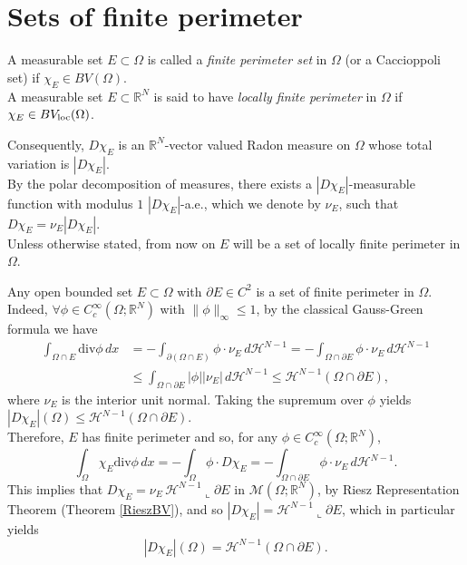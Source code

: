 \section{Sets of finite perimeter}

\begin{definition} A measurable set $E \subset \Omega$ is called a {\em finite perimeter set} in $\Omega$ (or a Caccioppoli set) if $\chi_{E} \in BV(\Omega)$.
\\
A measurable set $E \subset \mathbb{R}^{N}$ is said to have {\em locally finite perimeter} in $\Omega$ if $\chi_{E} \in BV_{\rm loc}(\Omega)$.
\end{definition}

Consequently, $D\chi_{E}$ is an $\mathbb{R}^{N}$-vector valued Radon measure on $\Omega$ whose total variation is $|D\chi_{E}|$.
\\
By the polar decomposition of measures, there exists a $|D\chi_{E}|$-measurable function with modulus $1$ $|D\chi_{E}|$-a.e., which we denote by $\nu_{E}$, such that $D\chi_{E} = \nu_{E} |D\chi_{E}|$.
\\
Unless otherwise stated, from now on $E$ will be a set of locally finite perimeter in $\Omega$.

\begin{example} Any open bounded set $E \subset \Omega$ with $\partial E \in C^{2}$ is a set of finite perimeter in $\Omega$.
\\ 
Indeed, $\forall \phi \in C_{c}^{\infty}(\Omega; \mathbb{R}^{N})$ with $\|\phi\|_{\infty} \le 1$, by the classical Gauss-Green formula we have
\begin{align*} \int_{\Omega \cap E} \mathrm{div} \phi \, dx & = - \int_{\partial(\Omega \cap E)} \phi \cdot \nu_{E} \, d\mathcal{H}^{N - 1}  = - \int_{\Omega \cap \partial E} \phi \cdot \nu_{E} \, d\mathcal{H}^{N - 1} \\
& \le \int_{\Omega \cap \partial E} |\phi| |\nu_{E}| \, d\mathcal{H}^{N - 1} \le \mathcal{H}^{N - 1}(\Omega \cap \partial E), 
\end{align*}
where $\nu_{E}$ is the interior unit normal. Taking the supremum over $\phi$ yields $|D \chi_{E}|(\Omega) \le \mathcal{H}^{N - 1}(\Omega \cap \partial E)$.
\\
Therefore, $E$ has finite perimeter and so, for any $\phi \in C^{\infty}_{c}(\Omega; \mathbb{R}^{N})$,
\[ \int_{\Omega} \chi_{E} \mathrm{div} \phi \, dx = - \int_{\Omega} \phi \cdot D \chi_{E} = - \int_{\Omega \cap \partial E} \phi \cdot \nu_{E} \, d\mathcal{H}^{N - 1}. \] 
This implies that $D \chi_{E} = \nu_{E} \, \mathcal{H}^{N - 1} \llcorner \partial E$ in $\mathcal{M}(\Omega; \mathbb{R}^{N})$, by Riesz Representation Theorem (Theorem \ref{RieszBV}), and so $|D \chi_{E}| = \mathcal{H}^{N - 1} \llcorner \partial E$, which in particular yields
\begin{equation} \label{Esmooth} |D \chi_{E}|(\Omega) = \mathcal{H}^{N - 1} (\Omega \cap \partial E). \end{equation}
\end{example}

